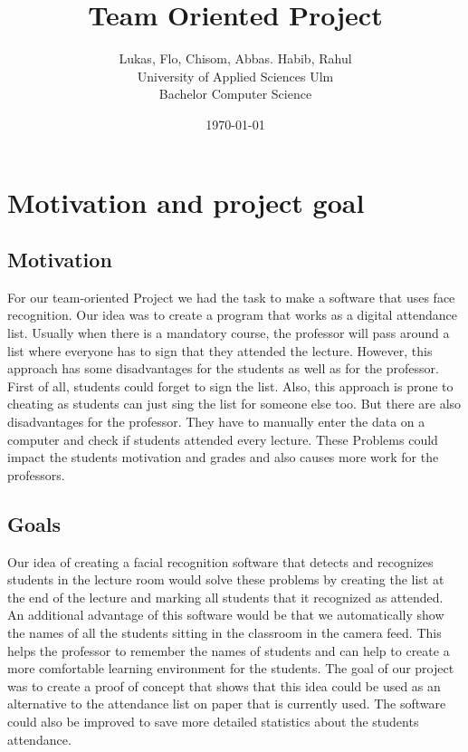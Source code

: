 \documentclass[12pt, a4paper]{article}
\title{Team Oriented Project}
\author{Lukas, Flo, Chisom, Abbas. Habib, Rahul \\
	University of Applied Sciences Ulm  \\
	Bachelor Computer Science 
	}
\date{\today}
\begin{document}
\maketitle




\newpage



\tableofcontents



\newpage

\section{Motivation and project goal}
\subsection{Motivation}
For our team-oriented Project we had the task to make a software that uses face recognition. Our idea was to create a program that works as a digital attendance list. Usually when there is a mandatory course, the professor will pass around a list where everyone has to sign that they attended the lecture. However, this approach has some disadvantages for the students as well as for the professor. First of all, students could forget to sign the list. Also, this approach is prone to cheating as students can just sing the list for someone else too. But there are also disadvantages for the professor. They have to manually enter the data on a computer and check if students attended every lecture. These Problems could impact the students motivation and grades and also causes more work for the professors. 

\subsection{Goals}
Our idea of creating a facial recognition software that detects and recognizes students in the lecture room would solve these problems by creating the list at the end of the lecture and marking all students that it recognized as attended. An additional advantage of this software would be that we automatically show the names of all the students sitting in the classroom in the camera feed. This helps the professor to remember the names of students and can help to create a more comfortable learning environment for the students. The goal of our project was to create a proof of concept that shows that this idea could be used as an alternative to the attendance list on paper that is currently used. The software could also be improved to save more detailed statistics about the students attendance. 
\end{document}
